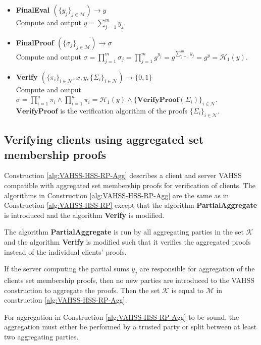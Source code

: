 \begin{algorithm}
\begin{itemize}
\item\textbf{FinalEval $(\{y_j\}_{j\in\mathcal{M}})\xrightarrow[]{}y$}\\
Compute and output $y = \sum_{j=1}^m y_{j}$.

\item\textbf{FinalProof $(\{\sigma_j\}_{j\in\mathcal{M}})\xrightarrow[]{}\sigma$}\\
Compute and output $\sigma = \prod_{j=1}^m \sigma_j = \prod_{j=1}^m g^{y_{j}} =  g^{\sum_{j=1}^m y_{j}}= g^{y}=\mathcal{H}_1(y)$.

\item\textbf{Verify $(\{\pi_i\}_{i\in\mathcal{N}},x,y,\{\Sigma_i\}_{i\in\mathcal{N}})\xrightarrow[]{}\{0,1\}$}\\
Compute and output $\sigma= \prod_{i=1}^n \pi_i \wedge \prod_{i=1}^n \pi_i = \mathcal{H}_1(y)\wedge \{\textbf{VerifyProof}( \Sigma_i) \}_{i\in\mathcal{N}}$. $\textbf{VerifyProof}$ is the verification algorithm of  the  proofs $\{\Sigma_i\}_{i\in\mathcal{N}}$.
\end{itemize}
\label{alg:VAHSS-HSS-RP}
\end{algorithm}

\subsection*{Verifying clients using aggregated set membership proofs}
Construction \ref{alg:VAHSS-HSS-RP-Agg} describes a client and server VAHSS compatible with aggregated set membership proofs for verification of clients. The algorithms in Construction \ref{alg:VAHSS-HSS-RP-Agg} are the same as in Construction \ref{alg:VAHSS-HSS-RP} except that the algorithm \textbf{PartialAggregate} is introduced and the algorithm \textbf{Verify} is modified. 

The algorithm \textbf{PartialAggregate} is run by all aggregating parties in the set $\mathcal{K}$ and the algorithm \textbf{Verify} is modified such that it verifies the aggregated proofs instead of the individual clients' proofs.

If the server computing the partial sums $y_j$ are responsible for aggregation of the clients set membership proofs, then no new parties are introduced to the VAHSS construction to aggregate the proofs.  Then the set $\mathcal{K}$ is equal to $\mathcal{M}$ in construction \ref{alg:VAHSS-HSS-RP-Agg}. 
 
For aggregation in Construction \ref{alg:VAHSS-HSS-RP-Agg} to be sound, the aggregation must either be performed by a trusted party or split between at least two aggregating parties. 

